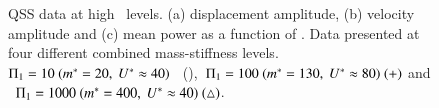 \begin{figure}
{\begin{picture}
%      
%  

      
    \end{picture}
}
  \caption{QSS data at high \massstiff \ levels. (a) displacement amplitude, (b) velocity amplitude and (c) mean power as a function of \massdamp. Data presented at four different combined mass-stiffness levels.\ $\massstiff=10 \ (\mstar=20,\ \ustar \approx 40)$ \ (),\ $\massstiff=100 \ (\mstar=130,\ \ustar \approx 80) \ (+)$ and \ $\massstiff=1000 \ (\mstar=400,\ \ustar \approx 40) \ (\triangle)$.}
    \label{fig:high_pi_1}
\end{figure}

